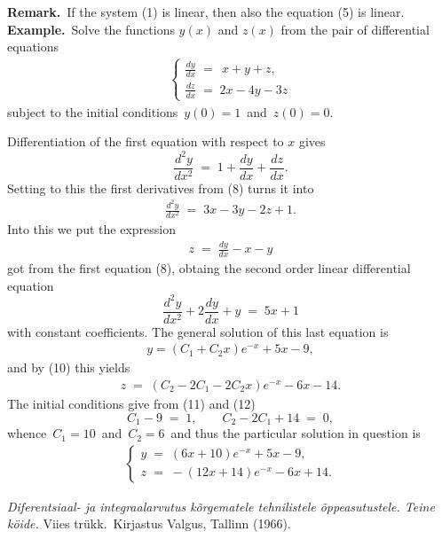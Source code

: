 \documentclass[12pt]{article}
\begin{document}
\textbf{Remark.}\, If the system (1) is linear, then also the 
equation (5) is linear.\\


\textbf{Example.}\, Solve the functions $y(x)$ and $z(x)$ from the pair 
of differential equations
\begin{align}
\begin{cases}
  \frac{dy}{dx} \;=\; \,x\!+\!y\!+\!z,\\
  \frac{dz}{dx} \;=\; 2x\!-\!4y\!-\!3z
\end{cases}
\end{align}
subject to the initial conditions\, $y(0) = 1$\, and\, 
$z(0) =0.$

Differentiation of the first equation with respect to $x$ gives
$$\frac{d^2y}{dx^2} \;=\; 1+\frac{dy}{dx}+\frac{dz}{dx}.$$
Setting to this the first derivatives from (8) turns it into
\begin{align}
 \frac{d^2y}{dx^2} \;=\; 3x-3y-2z+1. 
\end{align}
Into this we put the expression
\begin{align}
 z \;=\; \frac{dy}{dx}\!-\!x\!-\!y
\end{align}
 got 
from the first equation (8), obtaing the second order linear 
differential equation
$$\frac{d^2y}{dx^2}+2\frac{dy}{dx}+y \;=\; 5x\!+\!1$$
with constant coefficients.
The general solution of this last equation is
\begin{align}
  y = (C_1+C_2x)e^{-x}+5x-9, 
\end{align}
and by (10) this yields
\begin{align}
  z \;=\;  (C_2-2C_1-2C_2x)e^{-x}-6x-14. 
\end{align}
The initial conditions give from (11) and (12)
$$C_1-9 \;=\; 1, \qquad C_2-2C_1+14 \;=\; 0,$$
whence\, $C_1 = 10$\, and\, $C_2 = 6$\, and thus the 
particular solution in question is
\begin{align*}
\begin{cases}
  y \;=\; (6x+10)e^{-x}+5x-9,\\
  z \;=\; -(12x+14)e^{-x}-6x+14.
\end{cases}
\end{align*}




\begin{thebibliography}{9}
 {\em Diferentsiaal- ja 
integraalarvutus k\~{o}rgematele tehnilistele 
\~{o}ppeasutustele. Teine k\"{o}ide.} Viies tr\"{u}kk.\, 
Kirjastus Valgus, Tallinn  (1966).
\end{thebibliography}\\
\end{document}
